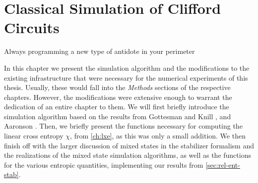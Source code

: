 \chapter{Classical Simulation of Clifford Circuits}
\label{ch:mixed}
\epigraph{Always programming a new type of antidote in your perimeter}{
\citeauthor{quasimotoDiscipline99Pt2000}
}

In this chapter we present the simulation algorithm and 
the modifications to the existing infrastructure that
were necessary for the numerical experiments of this thesis. Usually, these
would fall into the \emph{Methods} sections of the respective
chapters. However, the modifications were extensive enough to warrant the
dedication of an entire chapter to them. We will first briefly introduce the
simulation algorithm based on the results from Gottesman and Knill
\cite{gottesmanHeisenbergRepresentationQuantum1998}, and Aaronson
\cite{aaronsonImprovedSimulationStabilizer2004}. Then, we briefly present
the functions
necessary for computing the linear cross entropy $\chi$, from \cref{ch:lxe}, as
this was only a small addition. We
then finish off with the larger discussion of mixed states in the stabilizer
formalism and the realizations of the mixed state simulation algorithms, as
well as the functions for the various entropic quantities, implementing our
results from \cref{sec:rel-ent-stab}.

%
%
%
%
%

